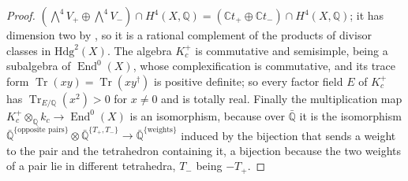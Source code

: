 \documentclass[11pt,reqno]{amsart}
\theoremstyle{plain}
\theoremstyle{definition}
\theoremstyle{remark}
\newcommand{\QQ}{\mathbb{Q}}
\newcommand{\CC}{\mathbb{C}}
\newcommand{\Hdg}{\mathrm{Hdg}}
\DeclareMathOperator{\End}{End}
\DeclareMathOperator{\Tr}{Tr}
\begin{document}
\begin{proof}
$(\bigwedge^{4}V_{+}\oplus\bigwedge^{4}V_{-})\cap H^{4}(X,\QQ)
=(\CC t_{+}\oplus\CC t_{-})\cap H^{4}(X,\QQ)$; it has dimension two by
\cite[Proposition~3.7(i)]{paperI}, so it is a rational complement of the products of
divisor classes in $\Hdg^{2}(X)$. The algebra $K_{c}^{+}$ is commutative and
semisimple, being a subalgebra of $\End^{0}(X)$, whose complexification is
commutative, and its trace form $\Tr(xy)=\Tr(xy^{\dagger})$ is positive
definite; so every factor field $E$ of $K_{c}^{+}$ has
$\Tr_{E/\QQ}(x^{2})>0$ for $x\ne0$ and is totally real. Finally the
multiplication map $K_{c}^{+}\otimes_{\QQ}k_{c}\to\End^{0}(X)$ is an
isomorphism, because over $\bar{\QQ}$ it is the isomorphism
$\bar{\QQ}^{\{\text{opposite pairs}\}}\otimes\bar{\QQ}^{\{T_{+},T_{-}\}}
\to\bar{\QQ}^{\{\text{weights}\}}$ induced by the bijection that sends a
weight to the pair and the tetrahedron containing it, a bijection because
the two weights of a pair lie in different tetrahedra, $T_{-}$ being $-T_{+}$.


\end{proof}
\end{document}
